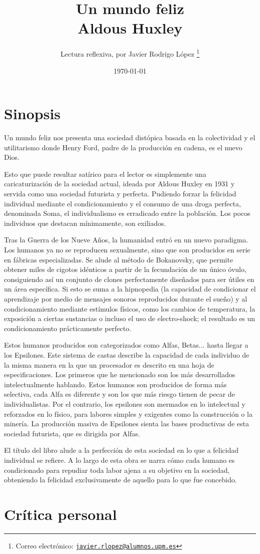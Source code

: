\documentclass{article}
\title{\Huge Un mundo feliz\\\vspace*{5pt}
\Large Aldous Huxley}
\author{Lectura reflexiva, por Javier Rodrigo López \thanks{Correo electrónico: \href{mailto:javier.rlopez@alumnos.upm.es}{\texttt{javier.rlopez@alumnos.upm.es}}}}
\date{\today}
\begin{document}
\maketitle
\tableofcontents
\newpage

\section{Sinopsis}

Un mundo feliz nos presenta una sociedad distópica basada en la colectividad y el utilitarismo donde Henry Ford, padre de la producción en cadena, es el nuevo Dios.

Esto que puede resultar satírico para el lector es simplemente una caricaturización de la sociedad actual, ideada por Aldous Huxley en 1931 y servida como una sociedad futurista y perfecta. Pudiendo forzar la felicidad individual mediante el condicionamiento y el consumo de una droga perfecta, denominada Soma, el individualismo es erradicado entre la población. Los pocos individuos que destacan mínimamente, son exiliados.

Tras la Guerra de los Nueve Años, la humanidad entró en un nuevo paradigma. Los humanos ya no se reproducen sexualmente, sino que son producidos en serie en fábricas especializadas. Se alude al método de Bokanovsky, que permite obtener miles de cigotos idénticos a partir de la fecundación de un único óvulo, consiguiendo así un conjunto de clones perfectamente diseñados para ser útiles en un área específica. Si esto se suma a la hipnopedia (la capacidad de condicionar el aprendizaje por medio de mensajes sonoros reproducidos durante el sueño) y al condicionamiento mediante estímulos físicos, como los cambios de temperatura, la exposición a ciertas sustancias o incluso el uso de electro-shock; el resultado es un condicionamiento prácticamente perfecto.

Estos humanos producidos son categorizados como Alfas, Betas... hasta llegar a los Epsilones. Este sistema de castas describe la capacidad de cada individuo de la misma manera en la que un procesador es descrito en una hoja de especificaciones. Los primeros que he mencionado son los más desarrollados intelectualmente hablando. Estos humanos son producidos de forma más selectiva, cada Alfa es diferente y son los que más riesgo tienen de pecar de individualistas. Por el contrario, los epsilones son mermados en lo intelectual y reforzados en lo físico, para labores simples y exigentes como la construcción o la minería. La producción masiva de Epsilones sienta las bases productivas de esta sociedad futurista, que es dirigida por Alfas.

El título del libro alude a la perfección de esta sociedad en lo que a felicidad individual se refiere. A lo largo de esta obra se narra cómo cada humano es condicionado para repudiar toda labor ajena a su objetivo en la sociedad, obteniendo la felicidad exclusivamente de aquello para lo que fue concebido.

\section{Crítica personal}
\end{document}
